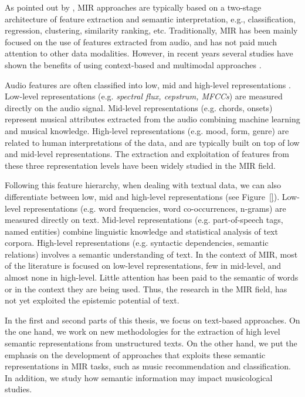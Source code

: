 As pointed out by \cite{humphrey2012}, MIR approaches are typically based on a two-stage architecture of feature extraction and semantic interpretation, e.g., classification, regression, clustering, similarity ranking, etc. 
Traditionally, MIR has been mainly focused on the use of features extracted from audio, and has not paid much attention to other data modalities. However, in recent years several studies have shown the benefits of using context-based and multimodal approaches \citep{Schedl2014}. 

Audio features are often classified into low, mid and high-level representations \citep{bello2015}. Low-level representations (e.g. \textit{spectral flux, cepstrum, MFCCs}) are measured directly on the audio signal. Mid-level representations (e.g. chords, onsets) represent musical attributes extracted from the audio combining machine learning and musical knowledge. High-level representations (e.g. mood, form, genre) are related to human interpretations of the data, and are typically built on top of low and mid-level representations. The extraction and exploitation of features from these three representation levels have been widely studied in the MIR field. 

Following this feature hierarchy, when dealing with textual data, we can also differentiate between low, mid and high-level representations (see Figure~\ref{}). Low-level representations (e.g. word frequencies, word co-occurrences, n-grams) are measured directly on text. Mid-level representations (e.g. part-of-speech tags, named entities) combine linguistic knowledge and statistical analysis of text corpora. High-level representations (e.g. syntactic dependencies, semantic relations) involves a semantic understanding of text. In the context of MIR, most of the literature is focused on low-level representations, few in mid-level, and almost none in high-level. Little attention has been paid to the semantic of words or in the context they are being used. Thus, the research in the MIR field, has not yet exploited the epistemic potential of text.

In the first and second parts of this thesis, we focus on text-based approaches. On the one hand, we work on new methodologies for the extraction of high level semantic representations from unstructured texts. On the other hand, we put the emphasis on the development of approaches that exploits these semantic representations in MIR tasks, such as music recommendation and classification. In addition, we study how semantic information may impact musicological studies.

